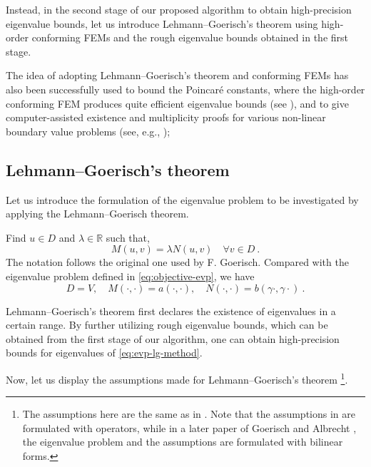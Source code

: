 \documentclass[a4,11pt]{article}
\numberwithin{equation}{section}
\begin{document}
Instead, in the second stage of our proposed algorithm to obtain high-precision eigenvalue bounds, let us introduce Lehmann--Goerisch's theorem using high-order conforming FEMs and the rough eigenvalue bounds obtained in the first stage.


The idea of adopting Lehmann--Goerisch's theorem and  conforming FEMs has also been successfully used to bound
the Poincar{\'{e}} constants, where the high-order conforming FEM produces quite efficient eigenvalue bounds (see \cite{liu-2013-2}), and to give computer-assisted existence and multiplicity proofs for various non-linear boundary value problems (see, e.g.,  \cite{plum1993numerical,breuer2003multiple,breuer2006computer,nakao2019numerical_book});

\subsection{Lehmann--Goerisch's theorem}

Let us introduce the formulation of the eigenvalue problem to be investigated by applying the Lehmann--Goerisch theorem.

\medskip

Find $u \in D$ and $\lambda \in \mathbb{R}$ such that,
\begin{equation}
\label{eq:evp-lg-method}
M(u,v) = \lambda N(u,v)\quad \forall v\in  D~.
\end{equation}
The notation follows the original one used by F. Goerisch. Compared with the eigenvalue problem defined in \cref{eq:objective-evp}, we have 
$$
D=V, \quad M(\cdot, \cdot)=a(\cdot, \cdot), \quad  N(\cdot, \cdot)=b(\gamma \cdot, \gamma \cdot)~.
$$ 

Lehmann--Goerisch's theorem first declares the existence of eigenvalues in a certain range. By further utilizing rough eigenvalue bounds, which can be obtained from the first stage of our algorithm, one can obtain high-precision bounds for eigenvalues of \cref{eq:evp-lg-method}. 

\medskip

Now, let us display the assumptions made for Lehmann--Goerisch's theorem \footnote{The assumptions here are the same as in  \cite{goerisch1985eigenwertschranken, goerisch1986convergence}. 
Note that the assumptions in \cite{goerisch1985eigenwertschranken} are formulated with operators, while in a later paper of Goerisch and Albrecht \cite{goerisch1986convergence}, the eigenvalue problem and the assumptions are formulated with  bilinear forms.}.
\end{document}
